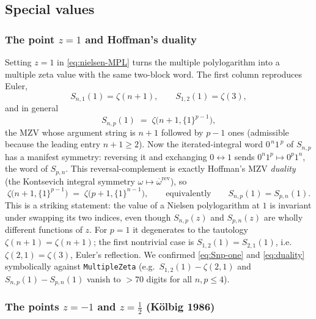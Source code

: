 \documentclass[11pt]{article}
\theoremstyle{plain}
\theoremstyle{remark}
\begin{document}
\subsection{Special values}

\subsubsection*{The point $z=1$ and Hoffman's duality}

Setting $z=1$ in \eqref{eq:nielsen-MPL} turns the multiple polylogarithm into a multiple zeta value with the same two-block word. The first column reproduces Euler,
\begin{equation}\label{eq:Snp-one-col}
  S_{n,1}(1)=\zeta(n+1),\qquad S_{1,2}(1)=\zeta(3),
\end{equation}
and in general
\begin{equation}\label{eq:Snp-one}
  S_{n,p}(1)\;=\;\zeta\bigl(n+1,\{1\}^{p-1}\bigr),
\end{equation}
the MZV whose argument string is $n+1$ followed by $p-1$ ones (admissible because the leading entry $n+1\ge2$). Now the iterated-integral word $0^{\,n}1^{\,p}$ of $S_{n,p}$ has a manifest symmetry: reversing it and exchanging $0\leftrightarrow1$ sends $0^{n}1^{p}\mapsto 0^{p}1^{n}$, the word of $S_{p,n}$. This reversal-complement is exactly Hoffman's MZV \emph{duality} (the Kontsevich integral symmetry $\omega\mapsto\overline{\omega}^{\mathrm{rev}}$), so
\begin{equation}\label{eq:duality}
  \boxed{\;\zeta\bigl(n+1,\{1\}^{p-1}\bigr)\;=\;\zeta\bigl(p+1,\{1\}^{n-1}\bigr),\qquad\text{equivalently}\qquad S_{n,p}(1)=S_{p,n}(1).\;}
\end{equation}
This is a striking statement: the value of a Nielsen polylogarithm at $1$ is invariant under swapping its two indices, even though $S_{n,p}(z)$ and $S_{p,n}(z)$ are wholly different functions of $z$. For $p=1$ it degenerates to the tautology $\zeta(n+1)=\zeta(n+1)$; the first nontrivial case is $S_{1,2}(1)=S_{2,1}(1)$, i.e.\ $\zeta(2,1)=\zeta(3)$, Euler's reflection. We confirmed \eqref{eq:Snp-one} and \eqref{eq:duality} symbolically against \texttt{MultipleZeta} (e.g.\ $S_{1,2}(1)-\zeta(2,1)$ and $S_{n,p}(1)-S_{p,n}(1)$ vanish to $>70$ digits for all $n,p\le4$).

\subsubsection*{The points $z=-1$ and $z=\tfrac12$ (Kölbig 1986)}
\end{document}
